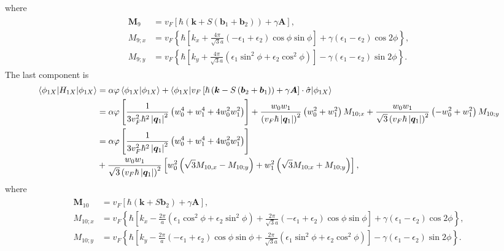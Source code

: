 \documentclass[10pt, oneside]{article}
\newcommand{\vph}{\varphi}
\newcommand{\p}[1]{\left(#1\right)}
\newcommand{\bb}[1]{\left[#1\right]}
\newcommand{\br}[1]{\left\{#1\right\}}
\newcommand{\bv}[1]{\left|#1\right|}
\begin{document}
where 
\begin{align}
	\begin{split}
		\bm{M}_{9} & = v_{F} \bb{\hbar \p{\bm{k} + S\p{\bm{b}_{1} + \bm{b}_{2}}} + \gamma \bm{A}}, \\
		M_{9;x} & = v_{F} \br{\hbar \bb{k_{x} + \frac{4 \pi}{\sqrt{3} a} \p{-\epsilon_{1} + \epsilon_{2}} \cos{\phi} \sin{\phi}} + \gamma \p{\epsilon_{1} - \epsilon_{2}} \cos{2 \phi}},\\
		M_{9;y} & = v_{F} \br{\hbar\bb{ k_{y} + \frac{4 \pi}{\sqrt{3} a}\p{\epsilon_{1} \sin^{2}{\phi} + \epsilon_{2} \cos^{2}{\phi}} } - \gamma\p{\epsilon_{1}-\epsilon_{2}}\sin{2\phi}}.
	\end{split}
\end{align}
The last component is 
\begin{align}
	\begin{split}
		\braket{\phi_{1X} | H_{1X} | \phi_{1X}} & = \alpha \vph \braket{\phi_{1X} | \phi_{1X}} + \braket{\phi_{1X} | v_{F} \bb{\hbar \p{\bm{k} - S\p{\bm{b}_{2} + \bm{b}_{1}}} + \gamma \bm{A}} \cdot \hat{\sigma} | \phi_{1X}}  \\
		& = \alpha \vph \bb{\frac{1}{3 v_{F}^{2} \hbar^{2} \bv{\bm{q}_{1}}^{2}} \p{w_{0}^{4} + w_{1}^{4} + 4 w_{0}^{2} w_{1}^{2}}}  + \frac{w_0 w_1}{\p{v_{F} \hbar \bv{\bm{q}_1}}^2}  \p{w_0^2 + w_1^2} M_{10;x} + \frac{w_0 w_1}{\sqrt{3} \p{v_{F} \hbar \bv{\bm{q}_1}}^2} \p{- w_0^2 + w_1^2 } M_{10;y} \\
		& = \alpha \vph \bb{\frac{1}{3 v_{F}^{2} \hbar^{2} \bv{\bm{q}_{1}}^{2}} \p{w_{0}^{4} + w_{1}^{4} + 4 w_{0}^{2} w_{1}^{2}}} \\
		& + \frac{w_0 w_1}{\sqrt{3} \p{v_{F} \hbar \bv{\bm{q}_1}}^2} \bb{w_0^2 \p{\sqrt{3} M_{10,x} - M_{10;y}} + w_1^2 \p{\sqrt{3} M_{10;x} + M_{10;y}}},
	\end{split}
\end{align}
where
\begin{align}
	\begin{split}
		\bm{M}_{10} & = v_{F} \bb{\hbar \p{\bm{k} + S\bm{b}_{2} } + \gamma \bm{A}}, \\
		M_{10;x} &  = v_{F} \br{\hbar \bb{k_{x} - \frac{2 \pi}{a} \p{\epsilon_{1} \cos^{2}{\phi} + \epsilon_{2} \sin^{2}{\phi}} + \frac{2 \pi}{\sqrt{3} a}\p{ - \epsilon_{1} + \epsilon_{2} } \cos{\phi} \sin{\phi}} + \gamma \p{\epsilon_{1} - \epsilon_{2}} \cos{2 \phi}}, \\
		M_{10;y} & = v_{F} \br{\hbar \bb{k_{y} - \frac{2 \pi}{ a} \p{ - \epsilon_{1} + \epsilon_{2} } \cos{\phi	} \sin{\phi}  + \frac{2 \pi}{\sqrt{3} a}\p{\epsilon_{1} \sin^{2}{\phi} + \epsilon_{2} \cos^{2}{\phi}}} - \gamma \p{\epsilon_{1} - \epsilon_{2}} \sin{2 \phi}}.
	\end{split}
\end{align}
\end{document}
